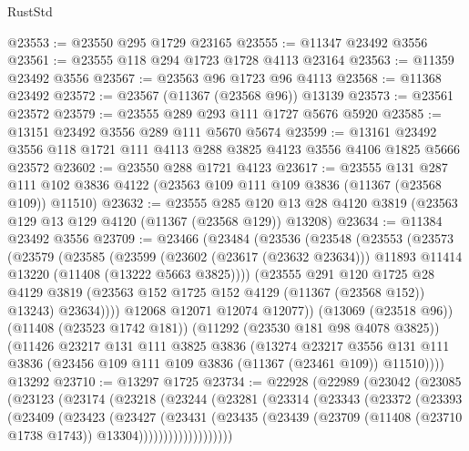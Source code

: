\begin{lexlean}{RustStd}
\begin{coremodule}
@23553 := @23550 @295 @1729 @23165
@23555 := @11347 @23492 @3556
@23561 := @23555 @118 @294 @1723 @1728 @4113 @23164
@23563 := @11359 @23492 @3556
@23567 := @23563 @96 @1723 @96 @4113
@23568 := @11368 @23492
@23572 := @23567 (@11367 (@23568 @96)) @13139
@23573 := @23561 @23572
@23579 := @23555 @289 @293 @111 @1727 @5676 @5920
@23585 := @13151 @23492 @3556 @289 @111 @5670 @5674
@23599 := @13161 @23492 @3556 @118 @1721 @111 @4113 @288 @3825 @4123 @3556 @4106 @1825 @5666 @23572
@23602 := @23550 @288 @1721 @4123
@23617 := @23555
    @131
    @287
    @111
    @102
    @3836
    @4122
    (@23563 @109 @111 @109 @3836 (@11367 (@23568 @109)) @11510)
@23632 := @23555
    @285
    @120
    @13
    @28
    @4120
    @3819
    (@23563 @129 @13 @129 @4120 (@11367 (@23568 @129)) @13208)
@23634 := @11384 @23492 @3556
@23709 := @23466
    (@23484
      (@23536
        (@23548
          (@23553
            (@23573
              (@23579
                (@23585
                  (@23599
                    (@23602 (@23617 (@23632 @23634)))
                    @11893
                    @11414
                    @13220
                    (@11408 (@13222 @5663 @3825))))
                (@23555
                  @291
                  @120
                  @1725
                  @28
                  @4129
                  @3819
                  (@23563 @152 @1725 @152 @4129 (@11367 (@23568 @152)) @13243)
                  @23634))))
          @12068
          @12071
          @12074
          @12077))
      (@13069 (@23518 @96))
      (@11408 (@23523 @1742 @181))
      (@11292 (@23530 @181 @98 @4078 @3825))
      (@11426
        @23217
        @131
        @111
        @3825
        @3836
        (@13274
          @23217
          @3556
          @131
          @111
          @3836
          (@23456 @109 @111 @109 @3836 (@11367 (@23461 @109)) @11510))))
    @13292
@23710 := @13297 @1725
@23734 := @22928
    (@22989
      (@23042
        (@23085
          (@23123
            (@23174
              (@23218
                (@23244
                  (@23281
                    (@23314
                      (@23343
                        (@23372
                          (@23393
                            (@23409
                              (@23423
                                (@23427
                                  (@23431
                                    (@23435
                                      (@23439
                                        (@23709
                                          (@11408 (@23710 @1738 @1743))
                                          @13304)))))))))))))))))))

\end{coremodule}
\end{lexlean}
